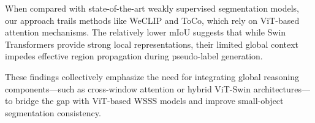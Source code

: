 When compared with state-of-the-art weakly supervised segmentation models, our approach trails methods like WeCLIP and ToCo, which rely on ViT-based attention mechanisms. The relatively lower mIoU suggests that while Swin Transformers provide strong local representations, their limited global context impedes effective region propagation during pseudo-label generation. 

These findings collectively emphasize the need for integrating global reasoning components—such as cross-window attention or hybrid ViT-Swin architectures—to bridge the gap with ViT-based WSSS models and improve small-object segmentation consistency.

